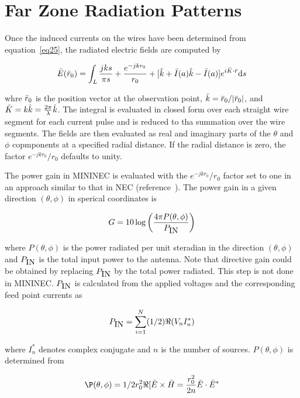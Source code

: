 \documentclass[12pt]{article}
\begin{document}
\section{Far Zone Radiation Patterns}
Once the induced currents on the wires have been determined from
equation~\eqref{eq25}, the radiated electric fields are computed by

\begin{equation}
\bar{E}(\bar{r}_0) = \int_L\frac{jks}{\pi s} + \frac{e^{-jkr_0}}{r_0}
+[\hat{k} + \bar{I}(a)\hat{k}-\bar{I}(a)]e^{i\bar{K}\cdot\bar{r}}\mathrm{d}s
\label{eq41}
\end{equation}

whre $\bar{r}_0$ is the position vector at the observation point,
$\bar{k} = \bar{r}_0 / |\bar{r}_0|$, and
$\bar{K} = k\hat{k} = \frac{2\pi}{\lambda}\hat{k}$. The integral is
evaluated in closed form over each straight wire segment for each
current pulse and is reduced to tha summation over the wire segments.
The fields are then evaluated as real and imaginary parts of the
$\theta$ and $\phi$ copmponents at a specified radial distance. If the
radial distance is zero, the factor $e^{-jkr_0}/r_0$ defaults to unity.

The power gain in MININEC is evaluated with the $e^{-jkr_0} / r_0$
factor set to one in an approach similar to that in NEC
(reference~\cite{r4}). The power gain in a given direction
$(\theta, \phi)$ in sperical coordinates is

\begin{equation}
G = 10 \log\left(\frac{4\pi P(\theta,\phi)}{P_{\mbox{IN}}}\right)
\label{eq42}
\end{equation}

where $P(\theta,\phi)$ is the power radiated per unit steradian in the
direction $(\theta, \phi)$ and $P_{\mbox{IN}}$ is the total input power to the
antenna. Note that directive gain could be obtained by replacing
$P_{\mbox{IN}}$ by the total power radiated. This step is not done in MININEC.
$P_{\mbox{IN}}$ is calculated from the applied voltages and the corresponding
feed point currents as

\begin{equation}
P_{\mbox{IN}} = \sum_{i=1}^{N}(1/2) \Re(V_n I_n^*)
\label{eq43}
\end{equation}

where $I_n^*$ denotes complex conjugate and $n$ is the number of
sources. $P(\theta,\phi)$ is determined from

\begin{equation}
\P(\theta,\phi) = 1/2 r_0^2 \Re[\vect{E}\times\vect{H}
= \frac{r_0^2}{2n}\vect{E}\cdot\vect{E}^*
\label{eq44}
\end{equation}
\end{document}
